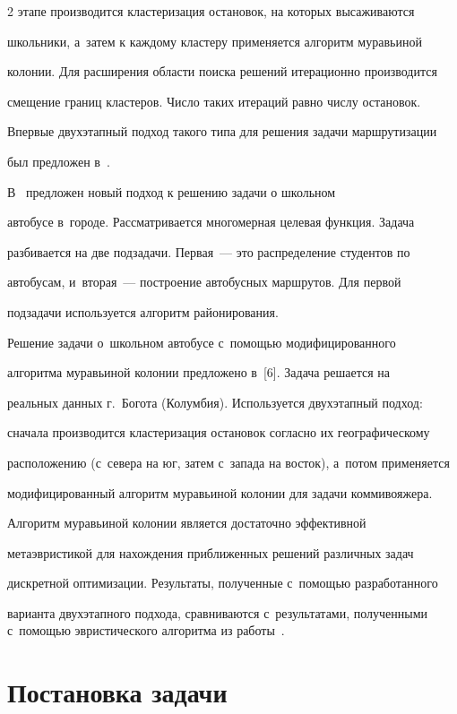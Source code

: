 \begin{multicols}{2}
этапе производится кластеризация остановок, на которых высаживаются

школьники, а~затем к каж\-до\-му кластеру применяется алгоритм муравьиной

колонии. Для расширения области поиска решений итерационно производится

смещение границ кластеров. Число таких итераций равно числу остановок.

Впервые двухэтапный подход такого типа для решения задачи маршрутизации

был предложен в~\cite{4-va}.



     В~\cite{5-va} предложен новый подход к решению задачи о школьном

автобусе в~городе. Рассматривается многомерная целевая функция. Задача

разбивается на две подзадачи. Первая~--- это распределение студентов по

автобусам, и~вторая~--- построение автобусных маршрутов. Для первой

подзадачи используется алгоритм районирования.



     Решение задачи о~школьном автобусе с~по\-мощью модифицированного

алгоритма муравьиной колонии предложено в~[6]. Задача решается на

реальных данных г.~Богота (Колумбия). Используется двухэтапный подход:

сначала производится кластеризация остановок согласно их географическому

расположению (с~севера на юг, затем с~запада на восток), а~потом применяется

модифицированный алгоритм муравьиной колонии для задачи коммивояжера.



     Алгоритм муравьиной колонии является достаточно эффективной

метаэвристикой для нахождения приближенных решений различных задач

дискретной оптимизации. Результаты, полученные с~помощью разработанного

варианта двухэтапного подхода, сравниваются с~результатами, полученными с~помощью эвристического алгоритма из работы~\cite{3-va}.



\section{Постановка задачи}




\end{multicols}

